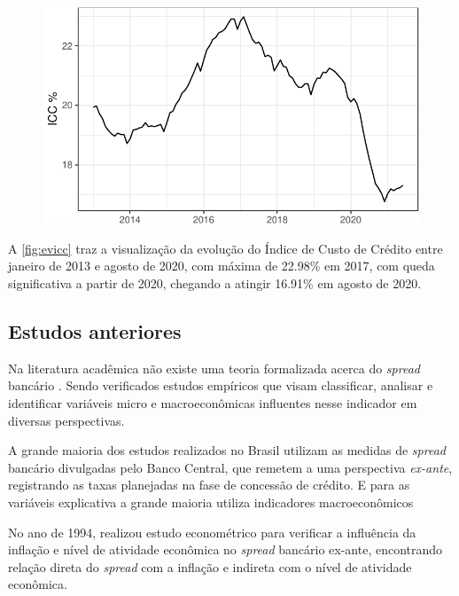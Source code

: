 \documentclass[12pt,12pt,openright,oneside,a4paper,chapter=TITLE,section=TITLE,subsection=TITLE,subsubsection=TITLE english,french,spanish,portugues,sumario=tradicional]{abntex2}
\begin{document}
\begin{figure}

\begin{center}\includegraphics{12-exportedfigures/ICC-1} \end{center}
\label{fig:evicc}
\end{figure}

A \autoref{fig:evicc} traz a visualização da evolução do Índice de Custo de
Crédito entre janeiro de 2013 e agosto de 2020, com máxima de 22.98\% em
2017, com queda significativa a partir de 2020, chegando a atingir 16.91\%
em agosto de 2020.

\subsection{Estudos anteriores}

Na literatura acadêmica não existe uma teoria formalizada acerca do \emph{spread}
bancário \cite{timotio:2018}. Sendo verificados estudos empíricos que visam
classificar, analisar e identificar variáveis micro e macroeconômicas
influentes nesse indicador em diversas perspectivas.

A grande maioria dos estudos realizados no Brasil utilizam as medidas de
\emph{spread} bancário divulgadas pelo Banco Central, que remetem a uma perspectiva
\emph{ex-ante}, registrando as taxas planejadas na fase de concessão de crédito. E
para as variáveis explicativa a grande maioria utiliza indicadores
macroeconômicos \cite{dantas:2012}

No ano de 1994, \textcite{aronovich:1994} realizou estudo econométrico para
verificar a influência da inflação e nível de atividade econômica no \emph{spread}
bancário ex-ante, encontrando relação direta do \emph{spread} com a inflação e
indireta com o nível de atividade econômica.
\end{document}
